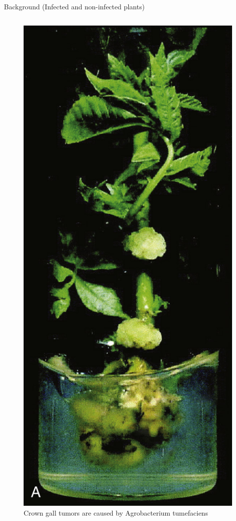 \documentclass[ignorenonframetext,aspectratio=169]{beamer}
\begin{document}
\begin{frame}{Background (Infected and non-infected plants)}
\protect\hypertarget{background-infected-and-non-infected-plants}{}

\begin{columns}[T,onlytextwidth]

\begin{figure}
\includegraphics[width=0.4\linewidth]{../images/agrobacterium_gall_a} \caption{Crown gall tumors are caused by Agrobacterium tumefaciens}\label{fig:agrobacterium-gall1}
\end{figure}



\end{columns}
\end{frame}
\end{document}
